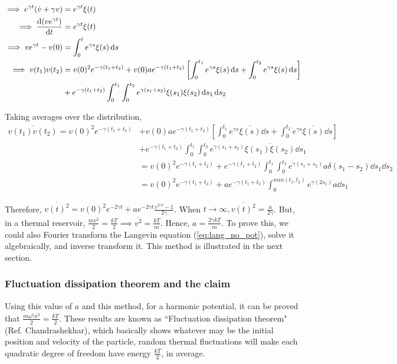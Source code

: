 \documentclass[12pt, twoside]{article}
\begin{document}
$\begin{aligned}\implies e^{\gamma t}(\dot{v}+\gamma v) &= e^{\gamma t} \xi(t) \\ \implies \derivative{(ve^{\gamma t})}{t} &= e^{\gamma t} \xi(t)\\ \implies ve^{\gamma t} - v(0) &= \int_{0}^{t} e^{\gamma s} \xi(s) \dd{s} \\ \implies v(t_1) v(t_2) &= v(0)^2 e^{-\gamma(t_1 + t_2)} + v(0) a e^{-\gamma(t_1 + t_2)} \left[\int_{0}^{t_1} e^{\gamma s} \xi(s) \dd{s} + \int_{0}^{t_2} e^{\gamma s} \xi(s) \dd{s}\right] \\&+ e^{-\gamma(t_1 + t_2)} \int_{0}^{t_1}\int_{0}^{t_2} e^{\gamma(s_1 + s_2)} \xi(s_1)\xi(s_2) \dd{s_1} \dd{s_2} \end{aligned}$

Taking averages over the distribution,\\
$\begin{aligned}\overline{v(t_1) v(t_2)} = v(0)^2 e^{-\gamma(t_1 + t_2)} &+ v(0) a e^{-\gamma(t_1 + t_2)} \left[\int_{0}^{t_1} e^{\gamma s} \overline{\xi(s)} \dd{s} + \int_{0}^{t_2} e^{\gamma s} \overline{\xi(s)} \dd{s}\right] \\&+ e^{-\gamma(t_1 + t_2)} \int_{0}^{t_1}\int_{0}^{t_2} e^{\gamma(s_1 + s_2)} \overline{\xi(s_1)\xi(s_2)} \dd{s_1} \\ &= v(0)^2 e^{-\gamma(t_1 + t_2)} + e^{-\gamma(t_1 + t_2)} \int_{0}^{t_1}\int_{0}^{t_2} e^{\gamma(s_1 + s_2)} {a} \delta(s_1 - s_2) \dd{s_1} \dd{s_2} \\ &= v(0)^2 e^{-\gamma(t_1 + t_2)} + a  e^{-\gamma(t_1 + t_2)} \int_{0}^{min(t_1,t_2)} e^{\gamma(2 s_1)} {a} \dd{s_1} \end{aligned}$

Therefore, $\overline{v(t)^2} = v(0)^2 e^{-2\gamma t} + a e^{-2\gamma t}\frac{e^{2\gamma t} - 1}{2\gamma}$. When $t \rightarrow \infty, \overline{v(t)^2} = \frac{a}{2\gamma}$. But, in a thermal reservoir, $\frac{m\overline{v^2}}{2} =\frac{k T}{2} \implies \overline{v^2} = \frac{kT}{m}$. Hence, $a = \frac{2 \gamma k T}{m}$. To prove this, we could also Fourier transform the Langevin equation (\ref{eq:lang_no_pot}), solve it algebraically, and inverse transform it. This method is illustrated in the next section.
\subsubsection{Fluctuation dissipation theorem and the claim}
Using this value of $a$ and this method, for a harmonic potential, it can be proved that $\frac{m \omega^2 \overline{x^2}}{2} = \frac{k T}{2}$. These results are known as ``Fluctuation dissipation theorem" (Ref. Chandrashekhar), which basically shows whatever may be the initial position and velocity of the particle, random thermal fluctuations will make each quadratic degree of freedom have energy $\frac{kT}{2}$, in average.
\end{document}
